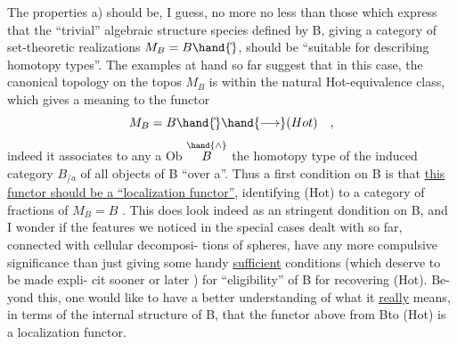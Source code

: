 The properties a) should be, I guess, no more no less than those
which express that the ``trivial'' algebraic structure species defined by
B, giving a category of set-theoretic realizations $M_B = B\hand{\hat{}}$, should be
``suitable for describing homotopy types''. The examples at hand so
far suggest that in this case, the canonical topology on the topos $M_B$
is within the natural Hot-equivalence class, which gives a meaning to
the functor
\[ M_B = B\hand{\hat{}} \hand{\longrightarrow} (Hot) \quad , \]
indeed it associates to any a \hand{$\in$} Ob $\overset{\hand{\wedge}}{B}$ the homotopy type of the induced
category $B_{/a}$ of all objects of B ``over a''. Thus a first condition on
B is that \uline{this functor should be a ``localization functor''}, identifying
(Hot) to a category of fractions of $M_B = B$\hand{$\hat{}$} . This does look indeed as
an  stringent dondition on B, and I wonder if the features we noticed in
the special cases dealt with so far, connected with cellular decomposi-%
tions of spheres, have any more compulsive significance than just
giving some handy \uline{sufficient} conditions (which deserve to be made expli-%
cit sooner or later \hand{!}) for ``eligibility'' of B for recovering (Hot). Be-%
yond this, one would  like to have a better understanding of what it
\uline{really} means, in terms of the internal structure of B, that the
functor above from B\hand{$\hat{}$}\hand{/}to (Hot) is a localization functor.
